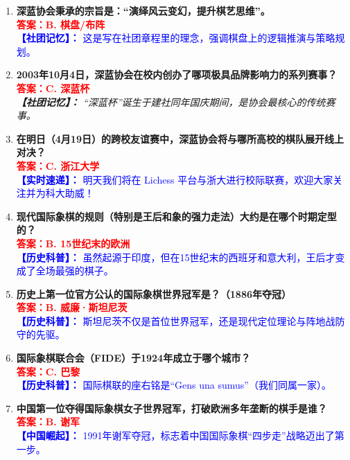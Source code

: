\documentclass[a4paper, 11pt]{ctexart}
\begin{document}
\begin{enumerate}[label=\arabic*., itemsep=1.5em]
    \item \textbf{深蓝协会秉承的宗旨是：“\uline{\hspace{1em}}演绎风云变幻，\uline{\hspace{1em}}提升棋艺思维”。} \\
    \textcolor{red}{\textbf{答案：B. 棋盘/布阵}} \\
    \textcolor{blue}{\textbf{【社团记忆】：} 这是写在社团章程里的理念，强调棋盘上的逻辑推演与策略规划。}

    \item \textbf{2003年10月4日，深蓝协会在校内创办了哪项极具品牌影响力的系列赛事？} \\
    \textcolor{red}{\textbf{答案：C. 深蓝杯}} \\
    \textit{\textbf{【社团记忆】：} “深蓝杯”诞生于建社同年国庆期间，是协会最核心的传统赛事。}

    \item \textbf{在明日（4月19日）的跨校友谊赛中，深蓝协会将与哪所高校的棋队展开线上对决？} \\
    \textcolor{red}{\textbf{答案：C. 浙江大学}} \\
    \textcolor{blue}{\textbf{【实时速递】：} 明天我们将在 Lichess 平台与浙大进行校际联赛，欢迎大家关注并为科大助威！}

    \item \textbf{现代国际象棋的规则（特别是王后和象的强力走法）大约是在哪个时期定型的？} \\
    \textcolor{red}{\textbf{答案：B. 15世纪末的欧洲}} \\
    \textcolor{blue}{\textbf{【历史科普】：} 虽然起源于印度，但在15世纪末的西班牙和意大利，王后才变成了全场最强的棋子。}

    \item \textbf{历史上第一位官方公认的国际象棋世界冠军是？（1886年夺冠）} \\
    \textcolor{red}{\textbf{答案：B. 威廉·斯坦尼茨}} \\
    \textcolor{blue}{\textbf{【历史科普】：} 斯坦尼茨不仅是首位世界冠军，还是现代定位理论与阵地战防守的先驱。}

    \item \textbf{国际象棋联合会（FIDE）于1924年成立于哪个城市？} \\
    \textcolor{red}{\textbf{答案：C. 巴黎}} \\
    \textcolor{blue}{\textbf{【历史科普】：} 国际棋联的座右铭是“Gens una sumus”（我们同属一家）。}

    \item \textbf{中国第一位夺得国际象棋女子世界冠军，打破欧洲多年垄断的棋手是谁？} \\
    \textcolor{red}{\textbf{答案：B. 谢军}} \\
    \textcolor{blue}{\textbf{【中国崛起】：} 1991年谢军夺冠，标志着中国国际象棋“四步走”战略迈出了第一步。}


\end{enumerate}
\end{document}
